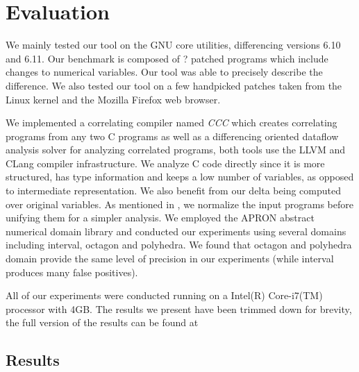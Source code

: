 \section{Evaluation}\label{Se:Evaluation}
We mainly tested our tool on the GNU core utilities, differencing versions 6.10 and 6.11. Our benchmark is composed of ? patched programs which include changes to numerical variables. Our tool was able to precisely describe the difference. We also tested our tool on a few handpicked patches taken from the Linux kernel and the Mozilla Firefox web browser.

We implemented a correlating compiler named \emph{CCC} which creates correlating programs from any two C programs as well as a differencing oriented dataflow analysis solver for analyzing correlated programs, both tools use the LLVM and CLang compiler infrastructure. We analyze C code directly since it is more structured, has type information and keeps a low number of variables, as opposed to intermediate representation. We also benefit from our delta being computed over original variables. As mentioned in , we normalize the input programs before unifying them for a simpler analysis. We employed the APRON abstract numerical domain library and conducted our experiments using several domains including interval, octagon and polyhedra. We found that octagon and polyhedra domain provide the same level of precision in our experiments (while interval produces many false positives).

All of our experiments were conducted running on a Intel(R) Core-i7(TM) processor with 4GB. The results we present have been trimmed down for brevity, the full version of the results can be found at 

\subsection{Results}

%


